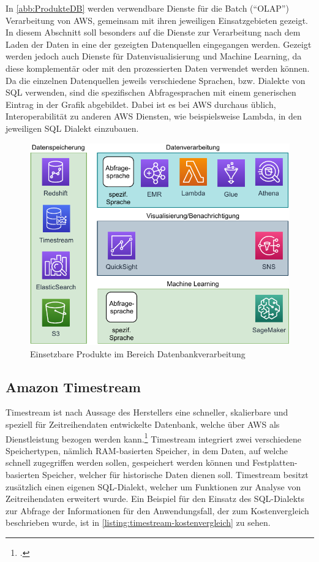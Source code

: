 In \autoref{abb:ProdukteDB} werden verwendbare Dienste für die Batch (\enquote{\ac{OLAP}}) Verarbeitung von \ac{AWS}, gemeinsam mit ihren jeweiligen Einsatzgebieten gezeigt. In diesem Abschnitt soll besonders auf die Dienste zur Verarbeitung nach dem Laden der Daten in eine der gezeigten Datenquellen eingegangen werden. Gezeigt werden jedoch auch Dienste für Datenvisualisierung und Machine Learning, da diese komplementär oder mit den prozessierten Daten verwendet werden können. Da die einzelnen Datenquellen jeweils verschiedene Sprachen, bzw. Dialekte von \ac{SQL} verwenden, sind die spezifischen Abfragesprachen mit einem generischen Eintrag in der Grafik abgebildet. Dabei ist es bei \ac{AWS} durchaus üblich, Interoperabilität zu anderen \ac{AWS} Diensten, wie beispielsweise Lambda, in den jeweiligen \ac{SQL} Dialekt einzubauen.

\begin{figure}[H]
\centering
\includegraphics[width=\textwidth]{graphics/Overview-DB.pdf}
\caption{Einsetzbare Produkte im Bereich Datenbankverarbeitung}
\label{abb:ProdukteDB}
\end{figure}


\subsection{Amazon Timestream}
Timestream ist nach Aussage des Herstellers eine schneller, skalierbare und speziell für Zeitreihendaten entwickelte Datenbank, welche über \ac{AWS} als Dienstleistung bezogen werden kann.\footcite[Vgl. auch im Folgenden][]{AmazonWebServicesInc..o.J.h} Timestream integriert zwei verschiedene Speichertypen, nämlich \ac{RAM}-basierten Speicher, in dem Daten, auf welche schnell zugegriffen werden sollen, gespeichert werden können und Festplatten-basierten Speicher, welcher für historische Daten dienen soll.
Timestream besitzt zusätzlich einen eigenen \ac{SQL}-Dialekt, welcher um Funktionen zur Analyse von Zeitreihendaten erweitert wurde. Ein Beispiel für den Einsatz des \ac{SQL}-Dialekts zur Abfrage der Informationen für den Anwendungsfall, der zum Kostenvergleich beschrieben wurde, ist in \autoref{listing:timestream-kostenvergleich} zu sehen.

